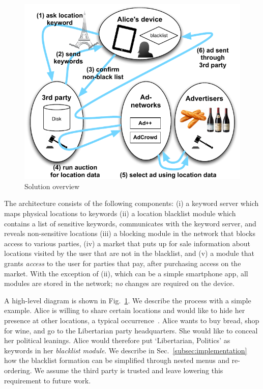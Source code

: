 \begin{figure}
  \begin{center}
    \includegraphics[width=0.9\linewidth]{fig/keyword/TLPOverview.pdf}
  \end{center}
  \caption{Solution overview}
  \label{fig:overview}
\end{figure}
The architecture consists of the following components: 
(i) a keyword server which maps physical locations to keywords
(ii) a location blacklist module which contains a list of sensitive keywords, 
communicates with the keyword server, and reveals non-sensitive locations
(iii) a blocking module in the network that blocks access to various parties, 
(iv) a market that puts up for sale information about locations visited by the user that are not in the blacklist, 
and (v) a module that grants \emph{access}
to the user for parties that pay, after purchasing access on the market.
With the exception of (ii), which can be a simple smartphone app, all modules are stored in the network; \emph{no} changes are required on the device.

A high-level diagram is shown in Fig.~\ref{fig:overview}. 
We describe the process with a simple example. 
Alice is willing to share certain locations and would like to hide her presence at other locations, a typical occurrence~\cite{Kelley:2011}. 
Alice wants to buy bread, shop for wine, and go to the Libertarian party headquarters. 
She would like to conceal her political leanings.
Alice would therefore put `Libertarian, Politics' as keywords in her \emph{blacklist module}. 
We describe in Sec.~\ref{subsec:implementation} how the blacklist formation can be simplified through nested menus and re-ordering. 
We assume the third party is trusted and leave lowering this requirement to future work.


